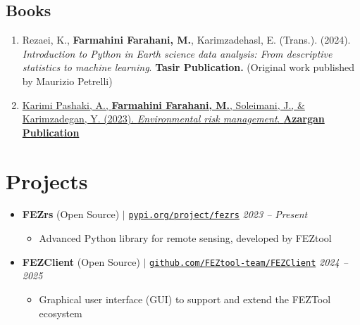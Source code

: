 \documentclass[letterpaper,11pt]{article}
\begin{document}
\begin{justify}
		\subsection*{Books}
		\begin{enumerate}[label=\arabic*.,left=0pt,topsep=7.5pt,partopsep=0pt,itemsep=3.5pt,parsep=0pt]
			\item Rezaei, K., \textbf{Farmahini Farahani, M.}, Karimzadehasl, E. (Trans.). (2024). \textit{Introduction to Python in Earth science data analysis: From descriptive statistics to machine learning}. \textbf{Tasir Publication.} (Original work published by Maurizio Petrelli)
			\item \href{https://www.researchgate.net/publication/374919527_Environmental_Risk_Management}{Karimi Pashaki, A., \textbf{Farmahini Farahani, M.}, Soleimani, J., \& Karimzadegan, Y. (2023). \textit{Environmental risk management}. \textbf{Azargan Publication}} 
		\end{enumerate}
	\end{justify}
	\vspace{-1.8em}
	
	\section{Projects}
	
	\begin{itemize}[left=0pt, label={}, topsep=7.5pt, partopsep=0pt, itemsep=6pt, parsep=0pt]
		\item \textbf{FEZrs} (Open Source) $|$ \normalfont\href{https://pypi.org/project/fezrs/}{\texttt{pypi.org/project/fezrs}} \hfill \textit{2023 – Present}
		\begin{itemize}[left=15pt, label=\textbullet, topsep=4pt, partopsep=0pt, itemsep=3pt, parsep=0pt]
			\item Advanced Python library for remote sensing, developed by FEZtool
		\end{itemize}
		
	\end{itemize}
	\begin{itemize}[left=0pt, label={}, topsep=7.5pt, partopsep=0pt, itemsep=6pt, parsep=0pt]
		\item \textbf{FEZClient} (Open Source) $|$ \normalfont\href{https://github.com/FEZtool-team/FEZClient}{\texttt{github.com/FEZtool-team/FEZClient}} \hfill \textit{2024 -- 2025}
		\begin{itemize}[left=15pt, label=\textbullet, topsep=4pt, partopsep=0pt, itemsep=3pt, parsep=0pt]
			\item Graphical user interface (GUI) to support and extend the FEZTool ecosystem
			
		\end{itemize}
	\end{itemize}
	
\end{document}
